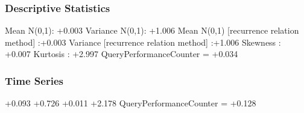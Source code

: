 \documentclass[9pt]{article}
\theoremstyle{plain}
\theoremstyle{definition}
\theoremstyle{remark}
\numberwithin{equation}{section}
\begin{document}
\subsubsection{Descriptive Statistics}
Mean N(0,1): +0.003
Variance N(0,1): +1.006
Mean N(0,1) [recurrence relation method] :+0.003
Variance [recurrence relation method] :+1.006
Skewness : +0.007
Kurtosis : +2.997
QueryPerformanceCounter  =  +0.034
\subsubsection{Time Series }
+0.093
+0.726
+0.011
+2.178
QueryPerformanceCounter  =  +0.128
\end{document}
